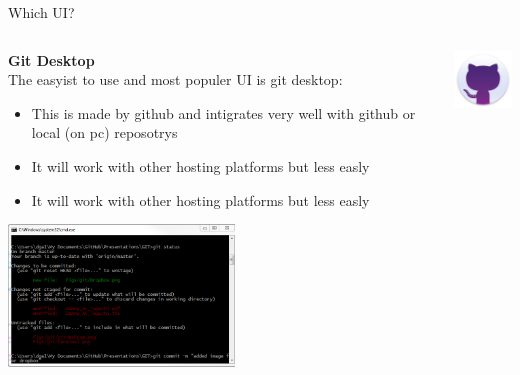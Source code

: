 \documentclass[10pt]{beamer}
\begin{document}
\begin{frame}[fragile]{Which UI?}
  \begin{columns}[T]
    \begin{column}{.8\textwidth}
  	\textbf{Git Desktop\\}
	The easyist to use and most populer UI is git desktop:
	\begin{itemize}
		\item This is made by github and intigrates very well with github or local (on pc) reposotrys
		\item It will work with other hosting platforms but less easly
		\item It will work with other hosting platforms but less easly
	\end{itemize}
	\includegraphics[width=6cm]{Figs/git/terminaluse}
    \end{column}
    \begin{column}{.2\textwidth}
	\includegraphics[width=2cm]{Figs/git/gitdesktop} \newline  \newline  \newline 
    \end{column}
  \end{columns}
\end{frame}
\end{document}
